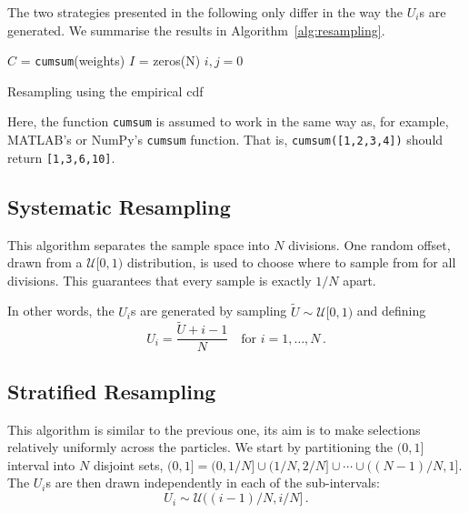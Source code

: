 The two strategies presented in the following only differ in the way
the $U_i$s are generated. We summarise the results in
Algorithm~\ref{alg:resampling}.

\begin{algorithm}[htpb]
  \SetAlgoLined \KwData{$N$ samples $U_i \sim \mathcal{U}(0, 1]$
    sorted in ascending order;\ list of weights}  $C$ =
  \texttt{cumsum}(weights)  $I$ = zeros(N)\; $i,j = 0$\; 
  \caption{Resampling using the empirical cdf}\label{alg:resampling}
\end{algorithm}

Here, the function \texttt{cumsum} is assumed to work in the same way
as, for example, MATLAB's or NumPy's \texttt{cumsum} function. That
is, \texttt{cumsum([1,2,3,4])} should return \texttt{[1,3,6,10]}.

\subsection*{Systematic Resampling}
This algorithm separates the sample space into $N$ divisions. One
random offset, drawn from a $\mathcal{U}[0, 1)$ distribution, is used
to choose where to sample from for all divisions. This guarantees that
every sample is exactly $1/N$ apart.

In other words, the $U_i$s are generated by sampling
$\tilde{U} \sim \mathcal{U}[0, 1)$ and defining
\[
  U_i = \frac{\tilde{U} + i-1}{N} \quad \text{for } i = 1, \dotsc, N
  \,.
\]

\subsection*{Stratified Resampling}
This algorithm is similar to the previous one, its aim is to make
selections relatively uniformly across the particles. We start by
partitioning the $(0,1]$ interval into $N$ disjoint sets,
$(0,1] = (0, 1/N] \cup (1/N, 2/N] \cup \dotsm \cup ((N-1)/N, 1]$. The
$U_i$s are then drawn independently in each of the sub-intervals:
\[
  U_i \sim \mathcal{U}((i-1)/N, i/N]\,.
\]

